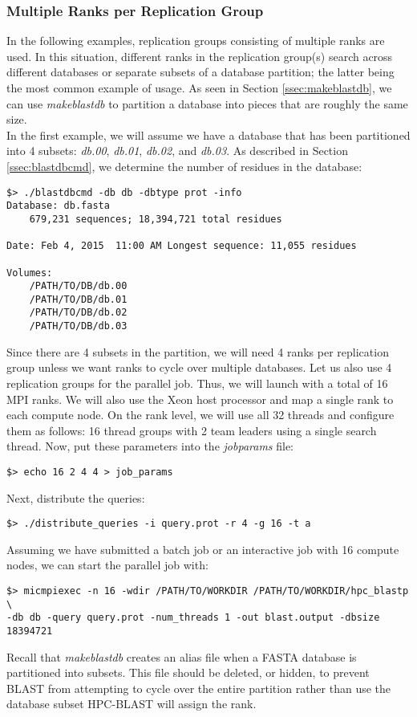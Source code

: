 \documentclass[10pt]{article}
\begin{document}
\subsubsection{Multiple Ranks per Replication Group} \label{sssec:hpcrepgs}

In the following examples, replication groups consisting of multiple ranks are used.  In this situation, different ranks in the replication group(s) search across different databases or separate subsets of a database partition; the latter being the most common example of usage.
As seen in Section \ref{ssec:makeblastdb}, we can use \emph{makeblastdb} to partition a database into pieces that are roughly the same size.\\

In the first example, we will assume we have a database that has been partitioned into 4 subsets: \emph{db.00}, \emph{db.01}, \emph{db.02}, and \emph{db.03}.  As described in Section \ref{ssec:blastdbcmd}, we determine the number of residues in the
database:
\begin{verbatim}
$> ./blastdbcmd -db db -dbtype prot -info
Database: db.fasta
	679,231 sequences; 18,394,721 total residues

Date: Feb 4, 2015  11:00 AM	Longest sequence: 11,055 residues

Volumes:
	/PATH/TO/DB/db.00
	/PATH/TO/DB/db.01
	/PATH/TO/DB/db.02
	/PATH/TO/DB/db.03
\end{verbatim}

\noindent Since there are 4 subsets in the partition, we will need 4 ranks per replication group unless we want ranks to cycle over multiple databases.
Let us also use 4 replication groups for the parallel job.  Thus, we will launch with a total of 16 MPI ranks.  We will also use the Xeon host processor and map a single rank to each compute node.  On the rank level, we will use all 32 threads and configure them as follows:
16 thread groups with 2 team leaders using a single search thread.  Now, put these parameters into the \emph{job\textunderscore params} file:
\begin{verbatim}
$> echo 16 2 4 4 > job_params
\end{verbatim}
\noindent Next, distribute the queries:
\begin{verbatim}
$> ./distribute_queries -i query.prot -r 4 -g 16 -t a
\end{verbatim}
\noindent Assuming we have submitted a batch job or an interactive job with 16 compute nodes, we can start the parallel job with:
\begin{verbatim}
$> micmpiexec -n 16 -wdir /PATH/TO/WORKDIR /PATH/TO/WORKDIR/hpc_blastp \
-db db -query query.prot -num_threads 1 -out blast.output -dbsize 18394721
\end{verbatim}
  Recall that \emph{makeblastdb} creates an alias file when a FASTA database is partitioned into subsets.  This file should be deleted, or hidden, to prevent BLAST from attempting to cycle over the entire partition rather than use the database subset HPC-BLAST
will assign the rank.\\
\end{document}
